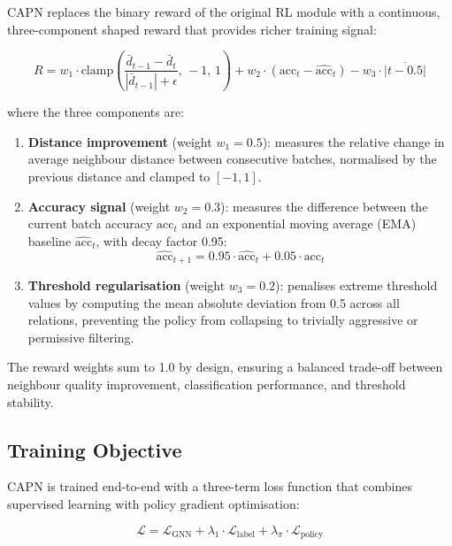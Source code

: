 CAPN replaces the binary reward of the original RL module with a continuous, three-component shaped reward that provides richer training signal:

\begin{equation}
R = w_1 \cdot \text{clamp}\!\left(\frac{\bar{d}_{t-1} - \bar{d}_t}{|\bar{d}_{t-1}| + \epsilon}, \, -1, \, 1\right) + w_2 \cdot \left(\text{acc}_t - \hat{\text{acc}}_t\right) - w_3 \cdot \overline{|t - 0.5|}
\end{equation}

\noindent
where the three components are:

\begin{enumerate}
    \item \textbf{Distance improvement} (weight \( w_1 = 0.5 \)): measures the relative change in average neighbour distance between consecutive batches, normalised by the previous distance and clamped to \([-1, 1]\).

    \item \textbf{Accuracy signal} (weight \( w_2 = 0.3 \)): measures the difference between the current batch accuracy \( \text{acc}_t \) and an exponential moving average (EMA) baseline \( \hat{\text{acc}}_t \), with decay factor 0.95:
    \begin{equation}
    \hat{\text{acc}}_{t+1} = 0.95 \cdot \hat{\text{acc}}_t + 0.05 \cdot \text{acc}_t
    \end{equation}

    \item \textbf{Threshold regularisation} (weight \( w_3 = 0.2 \)): penalises extreme threshold values by computing the mean absolute deviation from 0.5 across all relations, preventing the policy from collapsing to trivially aggressive or permissive filtering.
\end{enumerate}

\noindent
The reward weights sum to 1.0 by design, ensuring a balanced trade-off between neighbour quality improvement, classification performance, and threshold stability.

\subsection{Training Objective}
\label{sec:capn-loss}

CAPN is trained end-to-end with a three-term loss function that combines supervised learning with policy gradient optimisation:

\begin{equation}
\mathcal{L} = \mathcal{L}_{\text{GNN}} + \lambda_1 \cdot \mathcal{L}_{\text{label}} + \lambda_{\pi} \cdot \mathcal{L}_{\text{policy}}
\end{equation}

